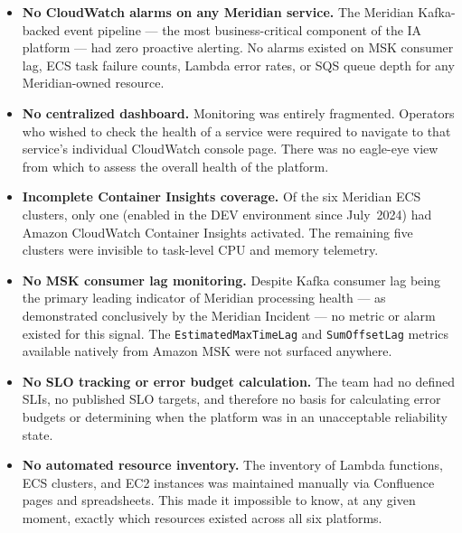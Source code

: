 \begin{itemize}
    \item \textbf{No CloudWatch alarms on any Meridian service.} The
          Meridian Kafka-backed event pipeline --- the most
          business-critical component of the IA platform --- had zero
          proactive alerting. No alarms existed on MSK consumer lag,
          ECS task failure counts, Lambda error rates, or SQS queue
          depth for any Meridian-owned resource.

    \item \textbf{No centralized dashboard.} Monitoring was entirely
          fragmented. Operators who wished to check the health of a
          service were required to navigate to that service's individual
          CloudWatch console page. There was no eagle-eye view
          from which to assess the overall health of the platform.

    \item \textbf{Incomplete Container Insights coverage.} Of the six
          Meridian ECS clusters, only one (enabled in the DEV environment
          since July~2024) had Amazon CloudWatch Container Insights activated. The
          remaining five clusters were invisible to task-level CPU and
          memory telemetry.

    \item \textbf{No MSK consumer lag monitoring.} Despite Kafka
          consumer lag being the primary leading indicator of Meridian
          processing health --- as demonstrated conclusively by the
          Meridian Incident --- no metric or alarm existed for this
          signal. The \texttt{EstimatedMaxTimeLag} and
          \texttt{SumOffsetLag} metrics available natively from Amazon
          MSK were not surfaced anywhere.

    \item \textbf{No SLO tracking or error budget calculation.}
          The team had no defined SLIs, no published SLO targets, and
          therefore no basis for calculating error budgets or
          determining when the platform was in an unacceptable
          reliability state.

    \item \textbf{No automated resource inventory.} The inventory of
          Lambda functions, ECS clusters, and EC2 instances was
          maintained manually via Confluence pages and spreadsheets.
          This made it impossible to know, at any given moment, exactly
          which resources existed across all six platforms.


\end{itemize}
